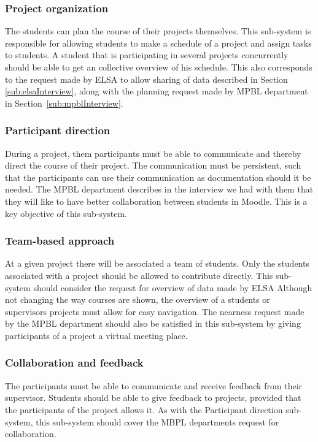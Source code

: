 \subsubsection{Project organization}
The students can plan the course of their projects themselves.
This sub-system is responsible for allowing students to make a schedule of a project and assign tasks to students.
A student that is participating in several projects concurrently should be able to get an collective overview of his schedule.
This also corresponds to the request made by ELSA to allow sharing of data described in Section \ref{sub:elsaInterview}, along with the planning request made by MPBL department in Section~\ref{sub:mpblInterview}.

\subsubsection{Participant direction}
During a project, them participants must be able to communicate and thereby direct the course of their project.
The communication must be persistent, such that the participants can use their communication as documentation should it be needed.
The MPBL department describes in the interview we had with them that they will like to have better collaboration between students in Moodle.
This is a key objective of this sub-system.

\subsubsection{Team-based approach}
At a given project there will be associated a team of students.
Only the students associated with a project should be allowed to contribute directly.
This sub-system should consider the request for overview of data made by ELSA
Although not changing the way courses are shown, the overview of a students or supervisors projects must allow for easy navigation.
The nearness request made by the MPBL department should also be satisfied in this sub-system by giving participants of a project a virtual meeting place.

\subsubsection{Collaboration and feedback}
The participants must be able to communicate and receive feedback from their supervisor.
Students should be able to give feedback to projects, provided that the participants of the project allows it.
As with the Participant direction sub-system, this sub-system should cover the MBPL departments request for collaboration.










